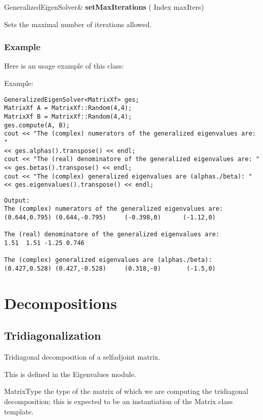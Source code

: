 \vspace{0.3cm}
GeneralizedEigenSolver\& \textbf{setMaxIterations}  ( Index  maxIters)   

Sets the maximal number of iterations allowed. 




\subsubsection{Example}

Here is an usage example of this class: 



Example:
\begin{lstlisting}
GeneralizedEigenSolver<MatrixXf> ges;
MatrixXf A = MatrixXf::Random(4,4);
MatrixXf B = MatrixXf::Random(4,4);
ges.compute(A, B);
cout << "The (complex) numerators of the generalized eigenvalues are: "
<< ges.alphas().transpose() << endl;
cout << "The (real) denominatore of the generalized eigenvalues are: "
<< ges.betas().transpose() << endl;
cout << "The (complex) generalized eigenvalues are (alphas./beta): "
<< ges.eigenvalues().transpose() << endl;
\end{lstlisting}

\begin{verbatim}
Output:
The (complex) numerators of the generalized eigenvalues are:  
(0.644,0.795) (0.644,-0.795)     (-0.398,0)      (-1.12,0)

The (real) denominatore of the generalized eigenvalues are:
1.51  1.51 -1.25 0.746

The (complex) generalized eigenvalues are (alphas./beta):  
(0.427,0.528) (0.427,-0.528)     (0.318,-0)       (-1.5,0)
\end{verbatim}






\newpage
\section{Decompositions}
\subsection{Tridiagonalization}
\label{Tridiagonalization}

Tridiagonal decomposition of a selfadjoint matrix. 

This is defined in the Eigenvalues module.

MatrixType the type of the matrix of which we are computing the tridiagonal decomposition; this is expected to be an instantiation of the Matrix class template. 

